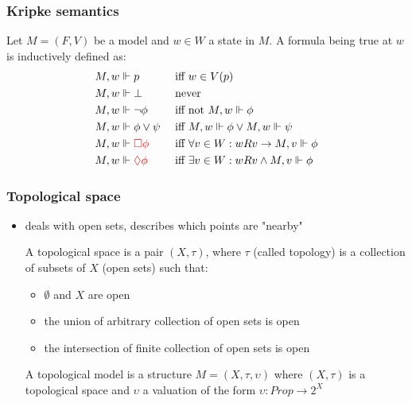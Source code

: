 \documentclass[hyperref={pdfpagelabels=false},t,10pt]{beamer}
\begin{document}
\begin{frame}
  \frametitle{Kripke semantics}

  \begin{definition}
      Let $M = (F,V)$ be a model and $w \in W$ a state in $M$. A formula being true at $w$ is inductively defined as: 
      \begin{align*}
        M, w &\Vdash p &&\text{ iff } w \in V(p) \\
        M, w &\Vdash \bot  &&\text{ never } \\
        M, w &\Vdash \neg \phi &&\text{ iff not } M, w \Vdash \phi \\ 
        M, w &\Vdash \phi \lor \psi &&\text{ iff } M,w \Vdash \phi \lor M,w \Vdash \psi \\
        M, w &\Vdash \textcolor{red}{\Box \phi} &&\text{ iff } \forall v \in W : wRv \rightarrow M, v \Vdash \phi \\
        M, w &\Vdash \textcolor{red}{\lozenge \phi} &&\text{ iff } \exists v \in W : wRv \land M,v \Vdash \phi
    \end{align*}  
  \end{definition}


  
\end{frame}



\begin{frame}
  \frametitle{Topological space}
  \begin{itemize}
    \item deals with open sets, describes which points are "nearby" \pause %
    \begin{definition}
             A topological space is a pair $(X, \tau)$, where $\tau$ (called topology) is a collection of subsets of $X$ (open sets) such that: \pause
        \begin{itemize}
          \item $\emptyset$ and $X$ are open
          \item the union of arbitrary collection of open sets is open
          \item the intersection of finite collection of open sets is open
        \end{itemize} \pause
          A topological model is a structure $M = (X,\tau, \upsilon)$ where $(X, \tau)$ is a topological space and $\upsilon$ a valuation of the form $\upsilon : Prop \rightarrow 2^X$  
    \end{definition}
    \end{itemize}
    \end{frame}
\end{document}
